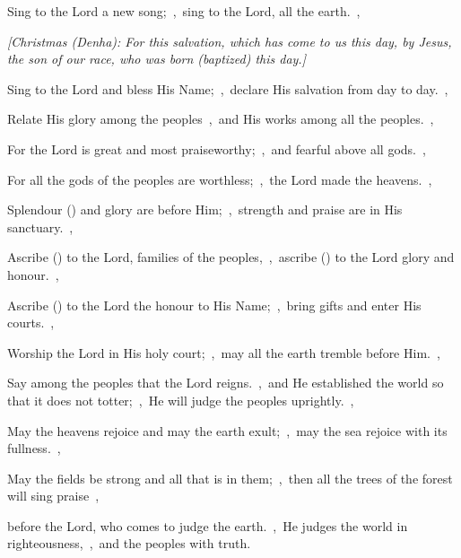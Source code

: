 \documentclass[12pt,twoside,a5paper]{article}
\begin{document}
\begin{normalparskip}
  Sing to the Lord a new song;~\sep\ sing to the Lord, all the earth.~\sep


  \emph{[Christmas (Denha): For this salvation, which has come to us this day, by Jesus, the son of our race, who was born (baptized) this day.]}

  Sing to the Lord and bless His Name;~\sep\ declare His salvation from day to day.~\sep

  Relate His glory among the peoples~\sep\ and His works among all the peoples.~\sep

  For the Lord is great and most praiseworthy;~\sep\ and fearful above all gods.~\sep

  For all the gods of the peoples are worthless;~\sep\ the Lord made the heavens.~\sep

  Splendour () and glory are before Him;~\sep\ strength and praise are in His sanctuary.~\sep

  Ascribe () to the Lord, families of the peoples,~\sep\ ascribe () to the Lord glory and honour.~\sep

  Ascribe () to the Lord the honour to His Name;~\sep\ bring gifts and enter His courts.~\sep

  Worship the Lord in His holy court;~\sep\ may all the earth tremble before Him.~\sep

  Say among the peoples that the Lord reigns.~\sep\ and He established the world so that it does not totter;~\sep\ He will judge the peoples uprightly.~\sep

  May the heavens rejoice and may the earth exult;~\sep\ may the sea rejoice with its fullness.~\sep

  May the fields be strong and all that is in them;~\sep\ then all the trees of the forest will sing praise~\sep

  before the Lord, who comes to judge the earth.~\sep\ He judges the world in righteousness,~\sep\ and the peoples with truth.
\end{normalparskip}

\end{document}
